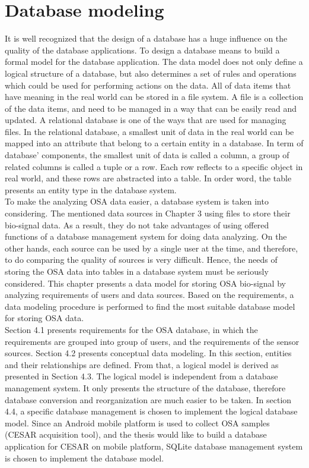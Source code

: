 \chapter{Database modeling}
It is well recognized that the design of a database has a huge influence on the quality of the database applications. To design a database means to build a formal model for the database application. The data model does not only define a logical structure of a database, but also determines a set of rules and operations which could be used for performing actions on the data. All of data items that have meaning in the real world can be stored in a file system. A file is a collection of the data items, and need to be managed in a way that can be easily read and updated. A relational database is one of the ways that are used for managing files. In the relational database, a smallest unit of data in the real world can be mapped into an attribute that belong to a certain entity in a database. In term of database’ components, the smallest unit of data is called a column, a group of related columns is called a tuple or a row. Each row reflects to a specific object in real world, and these rows are abstracted into a table. In order word, the table presents an entity type in the database system.\\
To make the analyzing OSA data easier, a database system is taken into considering. The mentioned data sources in Chapter 3 using files to store their bio-signal data. As a result, they do not take advantages of using offered functions of a database management system for doing data analyzing. On the other hands, each source can be used by a single user at the time, and therefore, to do comparing the quality of sources is very difficult. Hence, the needs of storing the OSA data into tables in a database system must be seriously considered.
This chapter presents a data model for storing OSA bio-signal by analyzing requirements of users and data sources. Based on the requirements, a data modeling procedure is performed to find the most suitable database model for storing OSA data.\\
Section 4.1 presents requirements for the OSA database, in which the requirements are grouped into group of users, and the requirements of the sensor sources. Section 4.2 presents conceptual data modeling. In this section, entities and their relationships are defined. From that, a logical model is derived as presented in Section 4.3. The logical model is independent from a database management system. It only presents the structure of the database, therefore database conversion and reorganization are much easier to be taken. In section 4.4, a specific database management is chosen to implement the logical database model. Since an Android mobile platform is used to collect OSA samples (CESAR acquisition tool), and the thesis would like to build a database application for CESAR on mobile platform, SQLite database management system is chosen to implement the database model.
